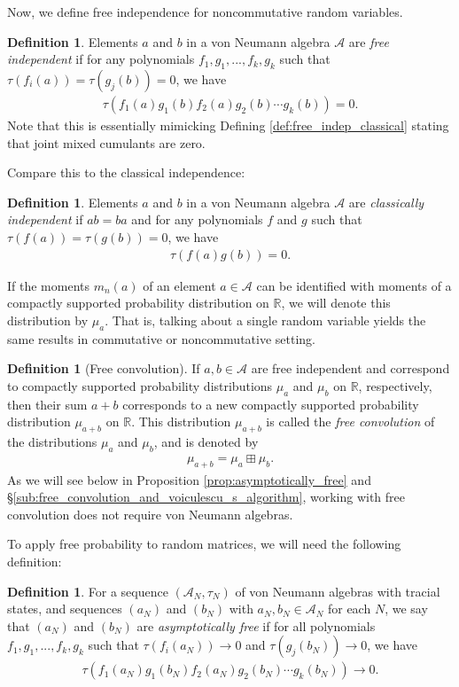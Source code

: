 \documentclass[letterpaper,11pt,oneside,reqno]{amsart}
\numberwithin{equation}{section}
\theoremstyle{definition}
\newtheorem{definition}[proposition]{Definition}
\begin{document}
Now, we define free independence for noncommutative random variables. 
\begin{definition}
Elements $a$ and $b$ in a von Neumann algebra $\mathcal{A}$ are \emph{free independent} if for any polynomials $f_1,g_1,..., f_k, g_k$ such that $\tau(f_i(a))=\tau(g_j(b))=0$, we have 
\begin{align*}
    \tau(f_1(a)g_1(b)f_2(a)g_2(b)\cdots g_k(b))=0.
\end{align*}
Note that this is essentially mimicking Defining \ref{def:free_indep_classical} 
stating that joint mixed cumulants are zero. 
\end{definition}
Compare this to the classical independence:
\begin{definition}
Elements $a$ and $b$ in a von Neumann algebra $\mathcal{A}$ are \emph{classically independent} if $ab=ba$ and for any polynomials $f$ and $g$ such that $\tau(f(a))=\tau(g(b))=0$, we have 
\begin{align*}
    \tau(f(a)g(b))=0.
\end{align*}
\end{definition}
If the moments $m_n(a)$ of an element $a\in\mathcal{A}$
can be identified with moments of a compactly supported probability distribution on $\mathbb{R}$,
we will denote this distribution by $\mu_a$.
That is, talking about a single random variable yields the same results
in commutative or noncommutative setting.
\begin{definition}[Free convolution]\label{def:free_convolution}
	If $a,b\in\mathcal{A}$ are free independent and correspond to compactly
	supported probability distributions $\mu_a$ and $\mu_b$ on $\mathbb{R}$, respectively,
	then their sum $a+b$ corresponds to a new 
	compactly
	supported probability distribution $\mu_{a+b}$ on $\mathbb{R}$. 
	This distribution $\mu_{a+b}$ is called the \emph{free convolution}
	of the distributions $\mu_a$ and $\mu_b$, and is denoted by 
	\begin{align*}
		\mu_{a+b}=\mu_a\boxplus\mu_b.
	\end{align*}
	As we will see below in Proposition \ref{prop:asymptotically_free}
	and \S \ref{sub:free_convolution_and_voiculescu_s_algorithm}, working with free convolution 
	does not require von Neumann algebras.
\end{definition}


To apply free probability to random matrices, we will need the following definition:
\begin{definition}
For a sequence $(\mathcal{A}_N,\tau_N)$ of von Neumann algebras with tracial states, and sequences $(a_N)$ and $(b_N)$ with $a_N, b_N\in \mathcal{A}_N$ 
for each $N$, we say that $(a_N)$ and $(b_N)$ are \emph{asymptotically free} if 
for all polynomials $f_1,g_1,..., f_k, g_k$ such that $\tau(f_i(a_N))\to 0$ and $\tau(g_j(b_N))\to0$, we have 
\begin{align*}
    \tau(f_1(a_N)g_1(b_N)f_2(a_N)g_2(b_N)\cdots g_k(b_N))\to 0.
\end{align*}
\end{definition}
\end{document}
